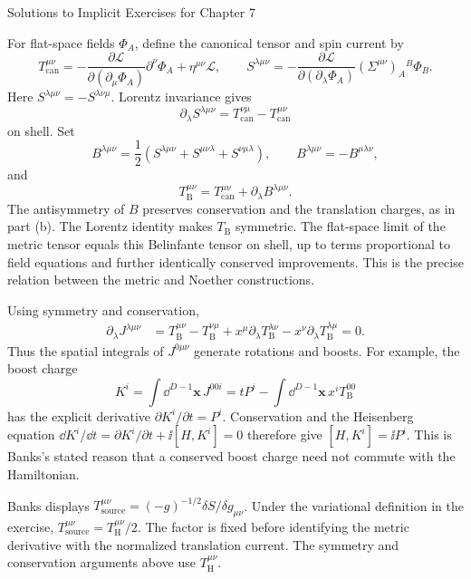 \begin{bankssolutions}{Solutions to Implicit Exercises for Chapter 7}
\begin{enumerate}[label=(\alph*)]
For flat-space fields $\Phi_A$, define the canonical tensor and spin current
by
\[
 T_{\mathrm{can}}^{\mu\nu}
 =-\frac{\partial\mathcal L}{\partial(\partial_\mu\Phi_A)}
 \partial^\nu\Phi_A+\eta^{\mu\nu}\mathcal L,
 \qquad
 S^{\lambda\mu\nu}
 =-\frac{\partial\mathcal L}{\partial(\partial_\lambda\Phi_A)}
 (\Sigma^{\mu\nu})_A{}^B\Phi_B.
\]
Here $S^{\lambda\mu\nu}=-S^{\lambda\nu\mu}$.  Lorentz invariance gives
\[
 \partial_\lambda S^{\lambda\mu\nu}
 =T_{\mathrm{can}}^{\nu\mu}-T_{\mathrm{can}}^{\mu\nu}
\]
on shell.  Set
\[
 B^{\lambda\mu\nu}
 =\frac12\left(S^{\lambda\mu\nu}+S^{\mu\nu\lambda}
 +S^{\nu\mu\lambda}\right),
 \qquad B^{\lambda\mu\nu}=-B^{\mu\lambda\nu},
\]
and
\[
 T_{\mathrm B}^{\mu\nu}
 =T_{\mathrm{can}}^{\mu\nu}+\partial_\lambda
 B^{\lambda\mu\nu}.
\]
The antisymmetry of $B$ preserves conservation and the translation charges,
as in part (b).  The Lorentz identity makes $T_{\mathrm B}$ symmetric.  The
flat-space limit of the metric tensor equals this Belinfante tensor on shell,
up to terms proportional to field equations and further identically
conserved improvements.  This is the precise relation between the metric and
Noether constructions.

Using symmetry and conservation,
\begin{align*}
 \partial_\lambda J^{\lambda\mu\nu}
 &=T_{\mathrm B}^{\mu\nu}-T_{\mathrm B}^{\nu\mu}
 +x^\mu\partial_\lambda T_{\mathrm B}^{\lambda\nu}
 -x^\nu\partial_\lambda T_{\mathrm B}^{\lambda\mu}=0.
\end{align*}
Thus the spatial integrals of $J^{0\mu\nu}$ generate rotations and boosts.
For example, the boost charge
\[
 K^i=\int\dd^{D-1}\mathbf x\,J^{00i}
 =tP^i-\int\dd^{D-1}\mathbf x\,x^iT_{\mathrm B}^{00}
\]
has the explicit derivative $\partial K^i/\partial t=P^i$.  Conservation and
the Heisenberg equation
$\dd K^i/\dd t=\partial K^i/\partial t+\ii[H,K^i]=0$ therefore give
$[H,K^i]=\ii P^i$.  This is Banks's stated reason that a conserved boost
charge need not commute with the Hamiltonian.

Banks displays
$T_{\text{source}}^{\mu\nu}=(-g)^{-1/2}\delta S/\delta g_{\mu\nu}$.
Under the variational definition in the exercise,
$T_{\text{source}}^{\mu\nu}=T_{\mathrm H}^{\mu\nu}/2$.  The factor is fixed
before identifying the metric derivative with the normalized translation
current.  The symmetry and conservation arguments above use
$T_{\mathrm H}^{\mu\nu}$.


\end{enumerate}
\end{bankssolutions}
